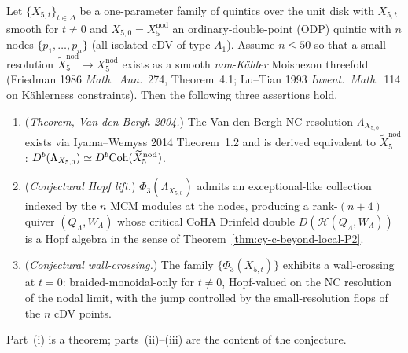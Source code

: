\begin{conjecture}
\label{thm:cy-c-beyond-tannakian-interpolation-nodal}
\ClaimStatusConjectured
Let $\{X_{5,t}\}_{t \in \Delta}$ be a one-parameter family of quintics
over the unit disk with $X_{5,t}$ smooth for $t \neq 0$ and
$X_{5,0} = X_5^{\mathrm{nod}}$ an ordinary-double-point (ODP) quintic
with $n$ nodes $\{p_1, \ldots, p_n\}$ (all isolated cDV of type $A_1$).
Assume $n \leq 50$ so that a small resolution
$\widetilde X_5^{\mathrm{nod}} \to X_5^{\mathrm{nod}}$ exists as a
smooth \emph{non-K\"ahler} Moishezon threefold (Friedman 1986
\emph{Math.\ Ann.}\ 274, Theorem~4.1; Lu--Tian 1993
\emph{Invent.\ Math.}\ 114 on K\"ahlerness constraints). Then the
following three assertions hold.
\begin{enumerate}[label=\textup{(\roman*)}]
 \item (\emph{Theorem, Van den Bergh 2004.}) The Van den Bergh NC
 resolution $\Lambda_{X_{5,0}}$ exists via Iyama--Wemyss 2014
 Theorem~1.2 and is derived equivalent to
 $\widetilde X_5^{\mathrm{nod}}$:
 $D^b(\Lambda_{X_{5,0}}) \simeq D^b\mathrm{Coh}(\widetilde X_5^{\mathrm{nod}})$.
 \item (\emph{Conjectural Hopf lift.}) $\Phi_3(\Lambda_{X_{5,0}})$
 admits an exceptional-like collection indexed by the $n$ MCM
 modules at the nodes, producing a rank-$(n+4)$ quiver
 $(Q_\Lambda, W_\Lambda)$ whose critical CoHA Drinfeld double
 $D(\mathcal H(Q_\Lambda, W_\Lambda))$ is a Hopf algebra in
 the sense of Theorem~\ref{thm:cy-c-beyond-local-P2}.
 \item (\emph{Conjectural wall-crossing.}) The family
 $\{\Phi_3(X_{5,t})\}$ exhibits a wall-crossing at $t = 0$:
 braided-monoidal-only for $t \neq 0$, Hopf-valued on the NC
 resolution of the nodal limit, with the jump controlled by
 the small-resolution flops of the $n$ cDV points.
\end{enumerate}
Part~(i) is a theorem; parts~(ii)--(iii) are the content of the
conjecture.
\end{conjecture}

